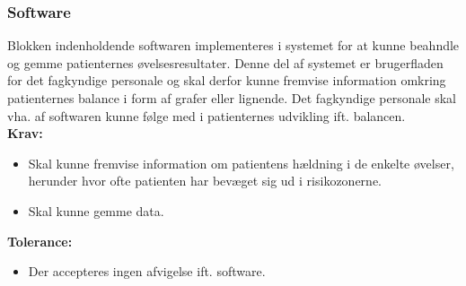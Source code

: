 \subsubsection{Software}
Blokken indenholdende softwaren implementeres i systemet for at kunne beahndle og gemme patienternes øvelsesresultater. Denne del af systemet er brugerfladen for det fagkyndige personale og skal derfor kunne fremvise information omkring patienternes balance i form af grafer eller lignende. Det fagkyndige personale skal vha. af softwaren kunne følge med i patienternes udvikling ift. balancen. \\
\textbf{Krav:}
\begin{itemize}
\item Skal kunne fremvise information om patientens hældning i de enkelte øvelser, herunder hvor ofte patienten har bevæget sig ud i risikozonerne. 
\item Skal kunne gemme data.
\end{itemize}
\textbf{Tolerance:}
\begin{itemize}
\item Der accepteres ingen afvigelse ift. software. 
\end{itemize}
